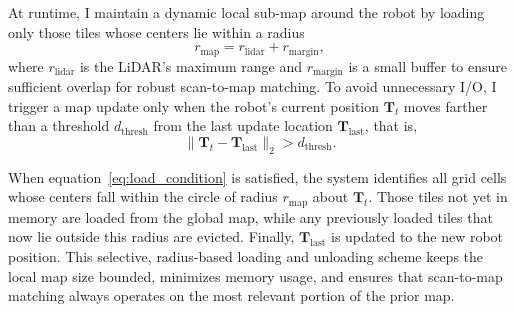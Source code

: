 At runtime, I maintain a dynamic local sub-map around the robot by loading only those tiles whose centers lie within a radius
\begin{equation}
	\label{eq:rmap}
	r_{\mathrm{map}} = r_{\mathrm{lidar}} + r_{\mathrm{margin}},
\end{equation}
where \(r_{\mathrm{lidar}}\) is the LiDAR’s maximum range and \(r_{\mathrm{margin}}\) is a small buffer to ensure sufficient overlap for robust scan-to-map matching. To avoid unnecessary I/O, I trigger a map update only when the robot’s current position \(\mathbf{T}_t\) moves farther than a threshold \(d_{\mathrm{thresh}}\) from the last update location \(\mathbf{T}_{\mathrm{last}}\), that is,
\begin{equation}
	\label{eq:load_condition}
	\|\mathbf{T}_t - \mathbf{T}_{\mathrm{last}}\|_2 > d_{\mathrm{thresh}}.
\end{equation}

When equation~\ref{eq:load_condition} is satisfied, the system identifies all grid cells whose centers fall within the circle of radius \(r_{\mathrm{map}}\) about \(\mathbf{T}_t\). Those tiles not yet in memory are loaded from the global map, while any previously loaded tiles that now lie outside this radius are evicted. Finally, \(\mathbf{T}_{\mathrm{last}}\) is updated to the new robot position. This selective, radius-based loading and unloading scheme keeps the local map size bounded, minimizes memory usage, and ensures that scan-to-map matching always operates on the most relevant portion of the prior map.


